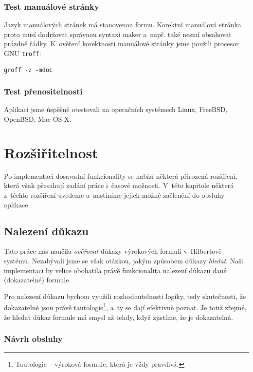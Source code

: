 \documentclass[thesis=B,czech,hidelinks]{thesis}[2012/06/26]
\begin{document}
\subsection{Test manuálové stránky}

Jazyk manuálových stránek má stanovenou formu. Korektní manuálová stránka proto musí dodržovat správnou syntaxi maker a~např. také nesmí obsahovat prázdné řádky. K~ověření korektnosti manuálové stránky jsme použili procesor GNU \texttt{troff}:

\begin{lstlisting}
groff -z -mdoc
\end{lstlisting}

\subsection{Test přenositelnosti}

Aplikaci jsme úspěšně otestovali na operačních systémech Linux, FreeBSD, OpenBSD, Mac OS X.

%
%
%

\chapter{Rozšiřitelnost}

Po implementaci dosavadní funkcionality se nabízí některá přirozená rozšíření, která však přesahují zadání práce i~časové možnosti. V~této kapitole některá z~těchto rozšíření uvedeme a~nastíníme jejich možné začlenění do obsluhy aplikace.

\section{Nalezení důkazu}

Tato práce nás naučila \emph{ověřovat} důkazy výrokových formulí v~Hilbertově systému. Nezabývali jsme se však otázkou, jakým způsobem důkazy \emph{hledat}. Naši implementaci by velice obohatila právě funkcionalita nalezení důkazu dané (dokazatelné) formule.

Pro nalezení důkazu bychom využili rozhodnutelnosti logiky, tedy skutečnosti, že dokazatelné jsou právě tautologie\footnote{Tautologie -- výroková formule, která je vždy pravdivá.}, a~ty se dají efektivně poznat. Je totiž zřejmé, že hledat důkaz formule má smysl až tehdy, když zjistíme, že je dokazatelná.

\subsection{Návrh obsluhy}
\end{document}
